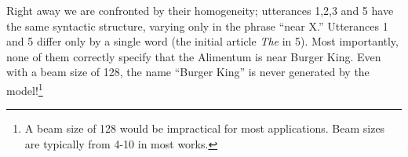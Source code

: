 \begin{enumerate}
\end{enumerate}
Right away we are confronted by their homogeneity; utterances 1,2,3 and 5 have
the same syntactic structure, varying only in the phrase ``near X.'' Utterances
1 and 5 differ only by a single word (the initial article \textit{The} in 5).
Most importantly, none of them correctly specify that the Alimentum is near
Burger King. Even with a beam size of 128, the name ``Burger King'' is never
generated by the model!\footnote{A beam size of 128 would be impractical for
most applications. Beam sizes are typically from 4-10 in most works.}



